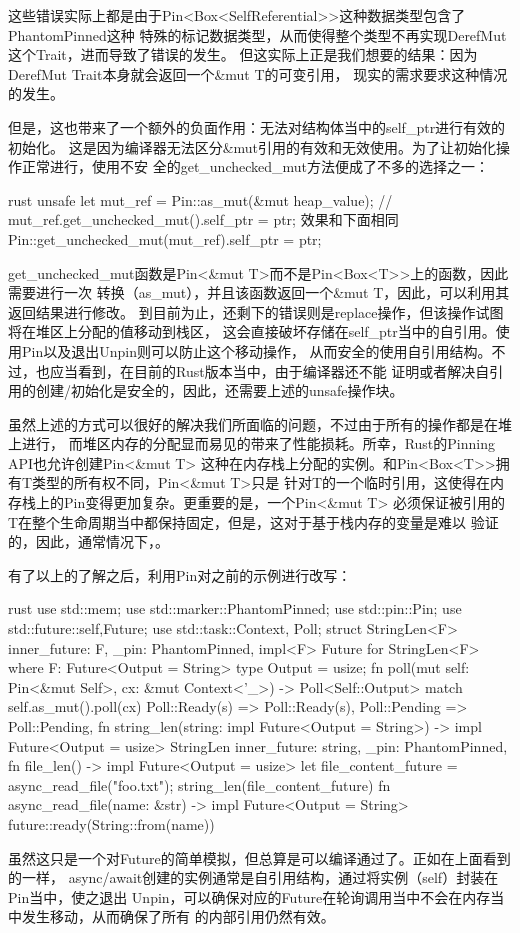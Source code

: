 这些错误实际上都是由于Pin<Box<SelfReferential>>这种数据类型包含了PhantomPinned这种
特殊的标记数据类型，从而使得整个类型不再实现DerefMut这个Trait，进而导致了错误的发生。
但这实际上正是我们想要的结果：因为DerefMut Trait本身就会返回一个\&mut T的可变引用，
现实的需求要求这种情况的发生。

但是，这也带来了一个额外的负面作用：无法对结构体当中的self\_ptr进行有效的初始化。
这是因为编译器无法区分\&mut引用的有效和无效使用。为了让初始化操作正常进行，使用不安
全的get\_unchecked\_mut方法便成了不多的选择之一：
\begin{code-block}{rust}
unsafe {
    let mut_ref = Pin::as_mut(&mut heap_value);
    // mut_ref.get_unchecked_mut().self_ptr = ptr; 效果和下面相同
    Pin::get_unchecked_mut(mut_ref).self_ptr = ptr;
}
\end{code-block}

get\_unchecked\_mut函数是Pin<\&mut T>而不是Pin<Box<T>>上的函数，因此需要进行一次
转换（as\_mut），并且该函数返回一个\&mut T，因此，可以利用其返回结果进行修改。
到目前为止，还剩下的错误则是replace操作，但该操作试图将在堆区上分配的值移动到栈区，
这会直接破坏存储在self\_ptr当中的自引用。使用Pin以及退出Unpin则可以防止这个移动操作，
从而安全的使用自引用结构。不过，也应当看到，在目前的Rust版本当中，由于编译器还不能
证明或者解决自引用的创建/初始化是安全的，因此，还需要上述的unsafe操作块。

虽然上述的方式可以很好的解决我们所面临的问题，不过由于所有的操作都是在堆上进行，
而堆区内存的分配显而易见的带来了性能损耗。所幸，Rust的Pinning API也允许创建Pin<\&mut T>
这种在内存栈上分配的实例。和Pin<Box<T>>拥有T类型的所有权不同，Pin<\&mut T>只是
针对T的一个临时引用，这使得在内存栈上的Pin变得更加复杂。更重要的是，一个Pin<\&mut T>
必须保证被引用的T在整个生命周期当中都保持固定，但是，这对于基于栈内存的变量是难以
验证的，因此，通常情况下，。

有了以上的了解之后，利用Pin对之前的示例进行改写：
\begin{code-block}{rust}
use std::mem;
use std::marker::PhantomPinned;
use std::pin::Pin;
use std::future::{self,Future};
use std::task::{Context, Poll};
struct StringLen<F> {
    inner_future: F,
    _pin: PhantomPinned,
}
impl<F> Future for StringLen<F> where F: Future<Output = String> {
    type Output = usize;
    fn poll(mut self: Pin<&mut Self>, cx: &mut Context<'_>) -> Poll<Self::Output> {
        match self.as_mut().poll(cx) {
            Poll::Ready(s) => Poll::Ready(s),
            Poll::Pending => Poll::Pending,
        }
    }
}
fn string_len(string: impl Future<Output = String>)
    -> impl Future<Output = usize>
{
    StringLen {
        inner_future: string,
        _pin: PhantomPinned,
    }
}
fn file_len() -> impl Future<Output = usize> {
    let file_content_future = async_read_file("foo.txt");
    string_len(file_content_future)
}
fn async_read_file(name: &str) -> impl Future<Output = String> {
    future::ready(String::from(name))
}
\end{code-block}
虽然这只是一个对Future的简单模拟，但总算是可以编译通过了。正如在上面看到的一样，
async/await创建的实例通常是自引用结构，通过将实例（self）封装在Pin当中，使之退出
Unpin，可以确保对应的Future在轮询调用当中不会在内存当中发生移动，从而确保了所有
的内部引用仍然有效。

